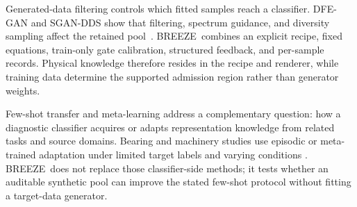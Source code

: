 \documentclass[a4paper,fleqn]{cas-sc}
\newcommand{\breeze}{BREEZE}
\begin{document}
Generated-data filtering controls which fitted samples reach a classifier.
DFE-GAN and SGAN-DDS show that filtering, spectrum guidance, and diversity
sampling affect the retained pool~\citep{liu2022dfegan,kim2024sgan}. \breeze\
combines an explicit recipe, fixed equations, train-only gate calibration,
structured feedback, and per-sample records. Physical knowledge therefore
resides in the recipe and renderer, while training data determine the supported
admission region rather than generator weights.

Few-shot transfer and meta-learning address a complementary question: how a
diagnostic classifier acquires or adapts representation knowledge from related
tasks and source domains. Bearing and machinery studies use episodic or
meta-trained adaptation under limited target labels and varying conditions
\citep{li2021mlfd,wu2020fewshot,su2022drhrml,feng2022metafd}. \breeze\ does not
replace those classifier-side methods; it tests whether an auditable synthetic
pool can improve the stated few-shot protocol without fitting a target-data
generator.
\end{document}
